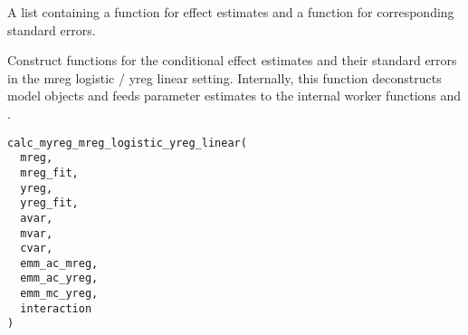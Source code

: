 \documentclass[a4paper]{book}
\begin{document}
%
\begin{Value}
A list containing a function for effect estimates and a function for corresponding standard errors.
\end{Value}
%
\begin{Description}
Construct functions for the conditional effect estimates and their standard errors in the mreg logistic / yreg linear setting. Internally, this function deconstructs model objects and feeds parameter estimates to the internal worker functions  and .
\end{Description}
%
\begin{Usage}
\begin{verbatim}
calc_myreg_mreg_logistic_yreg_linear(
  mreg,
  mreg_fit,
  yreg,
  yreg_fit,
  avar,
  mvar,
  cvar,
  emm_ac_mreg,
  emm_ac_yreg,
  emm_mc_yreg,
  interaction
)
\end{verbatim}
\end{Usage}
%
\end{document}
